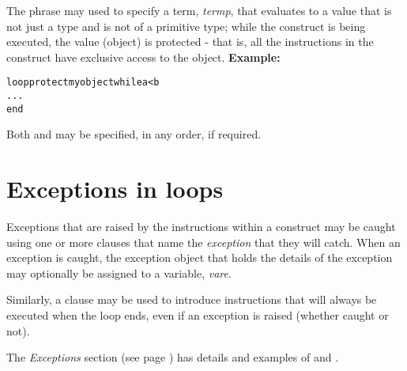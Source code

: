 The  phrase may used to specify a term,
\emph{termp}, that evaluates to a value that is not just a type and
is not of a primitive type;
while the  construct is being executed, the value (object)
is protected - that is, all the instructions in the 
construct have exclusive access to the object.
 \textbf{Example:}
\begin{alltt}
loop protect myobject while a<b
  ...
  end
\end{alltt}
 
Both  and  may be specified, in any order,
if required.
\section{Exceptions in loops}
 
Exceptions that are raised by the instructions within a 
construct may be caught using one or more  clauses that
name the \emph{exception} that they will catch.  When an exception is
caught, the exception object that holds the details of the exception may
optionally be assigned to a variable, \emph{vare}.
 
Similarly, a  clause may be used to introduce
instructions that will always be executed when the loop ends, even if an
exception is raised (whether caught or not).
 
The  \emph{Exceptions} section (see page \pageref{refexcep})  has details and
examples of  and .
